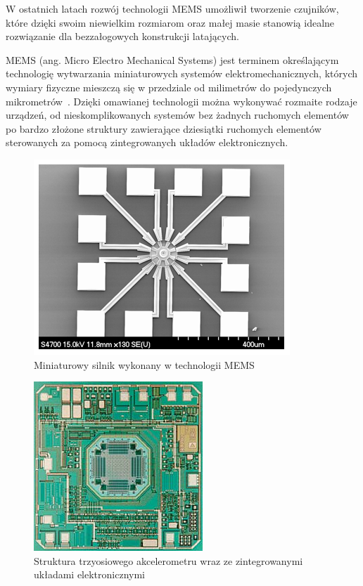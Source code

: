 W ostatnich latach rozwój technologii MEMS umożliwił tworzenie czujników, które dzięki swoim niewielkim rozmiarom oraz małej masie stanowią idealne rozwiązanie dla bezzałogowych konstrukcji latających. 

MEMS (ang. Micro Electro Mechanical Systems) jest terminem określającym technologię wytwarzania miniaturowych systemów elektromechanicznych, których wymiary fizyczne mieszczą się w przedziale od milimetrów do pojedynczych mikrometrów~\cite{mems3, mems12, mems14}. Dzięki omawianej technologii można wykonywać rozmaite rodzaje urządzeń, od nieskomplikowanych systemów bez żadnych ruchomych elementów po bardzo złożone struktury zawierające dziesiątki ruchomych elementów sterowanych za pomocą zintegrowanych układów elektronicznych. 

\begin{figure}[H]
	\centering
	\includegraphics[scale=0.7]{Pictures/microactuator.png}
		\caption[Miniaturowy silnik wykonany w technologii MEMS]{Miniaturowy silnik wykonany w technologii MEMS~\cite{mems15}}
	\label{fig:microactuator}
\end{figure}

\begin{figure}[H]
	\centering
	\includegraphics[scale=0.7]{Pictures/3d_accel.jpg}
		\caption[Struktura trzyosiowego akcelerometru wraz ze zintegrowanymi układami elektronicznymi]{Struktura trzyosiowego akcelerometru wraz ze zintegrowanymi układami elektronicznymi~\cite{mems16}}
	\label{fig:3d_accelerometer}
\end{figure}

